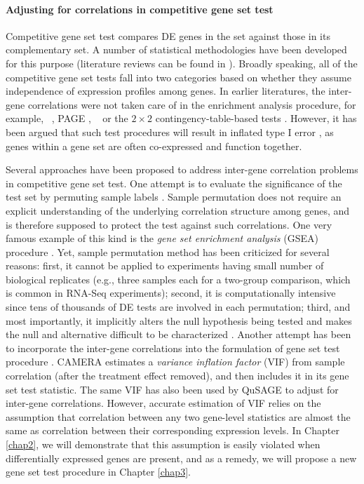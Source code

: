 \paragraph{Adjusting for correlations in competitive gene set test}
Competitive gene set test compares DE genes in the set against those in its complementary set. A
number of
statistical methodologies have been developed for this purpose (literature reviews can be found in
\cite{huang2009bioinformatics,khatri2012ten, mishra2014gene}). Broadly speaking, all of the
competitive gene set tests fall into two categories based on whether they assume independence of
expression profiles among genes. In earlier literatures, the inter-gene correlations were not taken
care of in the enrichment analysis procedure, for example, \gent~\citep{tian2005discovering}, PAGE
\citep{kim2005page}, \genr~\citep{michaud2008integrative} or the $2\times 2$ contingency-table-based
tests \cite{alexa2010topgo, huang2007david,ye2006wego}. However, it has been argued that such test
procedures will result in inflated type I error \citep{efron2007testing,goeman2007analyzing,
	gatti2010heading,wu2012camera,yaari2013quantitative}, as genes within a gene set are often
co-expressed and function together.

Several approaches have been proposed to address inter-gene correlation problems in competitive gene
set test. One attempt is to evaluate the significance of the test set by permuting sample labels
\citep{efron2007testing,gatti2010heading,subramanian2005gene}. Sample permutation does not require
an explicit understanding of the underlying correlation structure among genes, and is therefore
supposed to protect the test against such correlations. One very famous example of this kind is the
\textit{gene set enrichment analysis} (GSEA) procedure \citep{subramanian2005gene}. Yet, sample
permutation method has been criticized for several reasons: first, it cannot be applied to
experiments having small
number of biological replicates (e.g., three samples each for a two-group comparison, which is common in RNA-Seq experiments);
second, it is computationally intensive since tens of thousands of DE tests are involved in each permutation; 
third, and most importantly, it implicitly alters the null hypothesis being tested and makes the null and
alternative difficult to be characterized \citep{goeman2007analyzing, khatri2012ten, wu2012camera}.
Another attempt has been to incorporate the inter-gene correlations into the formulation of gene set
test procedure \citep{wu2012camera,yaari2013quantitative}. CAMERA \citep{wu2012camera} estimates a
\textit{variance
	inflation factor} (VIF) from sample correlation (after the treatment effect removed), and then
includes it in its gene set test statistic. The same VIF has also been used by QuSAGE
\cite{yaari2013quantitative} 
to adjust for inter-gene correlations. However, accurate estimation of VIF relies on
the assumption that correlation between any two gene-level statistics are almost the same as
correlation between their corresponding expression levels. In Chapter \ref{chap2}, we will
demonstrate that this assumption is easily violated when differentially expressed genes are present,
and as a remedy, we will propose a new gene set test procedure in Chapter \ref{chap3}.  

